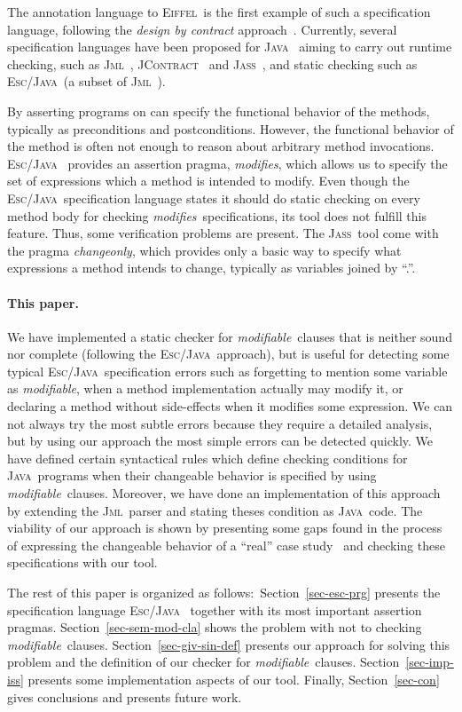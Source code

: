 \documentclass[a4paper]{llncs}
\newcommand{\jml}{\textsc{Jml}}
\newcommand{\escj}{\textsc{Esc/Java}}
\newcommand{\jass}{\textsc{Jass}}
\newcommand{\jcontract}{\textsc{JContract}}
\newcommand{\java}{\textsc{Java}}
\newcommand{\eiff}{\textsc{Eiffel}}
\newcommand{\modif}{\textit{modifiable}}
\newcommand{\modifies}{\textit{modifies}}
\begin{document}
The annotation language to \eiff~is the first example of such a
specification language, following the \emph{design by contract}
approach~\cite{Mey97}. Currently, several specification languages have
been proposed for \java~ aiming to carry out runtime
checking, such as \jml~\cite{LBR00}, \jcontract~\cite{JContractUrl} and
\jass~\cite{JassUrl}, and static checking such as
\escj~\cite{LeinoNS00}(a subset of \jml~\cite{EscJmlDiff}). 

By
asserting programs on can specify the functional
behavior of the methods, typically as preconditions and
postconditions. However, the functional behavior of the method is
often not enough to reason about arbitrary method
invocations. \escj~
provides an assertion pragma, \modifies, which allows us to
specify the set of expressions which a method is intended to
modify. Even though the \escj~specification language states it should
do static checking on every method body for checking
\modifies~specifications, its tool does not fulfill
this feature. Thus, some verification problems are
present. The \jass~tool come with the pragma \textit{changeonly},
which provides only a basic way to specify what expressions a method
intends to change, typically as variables joined by ``.''.

\paragraph{\bf This paper.}We
have implemented a static checker for \modif~clauses that is neither
sound nor complete (following the \escj~approach), but is useful
for detecting some typical \escj~specification errors such as
forgetting to mention some variable
as \modif, when a method implementation actually may modify it, or
declaring a method without side-effects when it modifies some
expression. We can not always try the most subtle errors because they 
require a detailed analysis, but by using our approach the most
simple errors can be detected quickly. We have defined certain
syntactical rules which define checking conditions for \java~programs
when their changeable behavior is specified by using
\modif~clauses. Moreover, we have done an implementation
of this approach by extending the \jml~parser and stating theses
condition as \java~code. The viability of our approach is
shown by presenting some gaps found in the process of expressing the
changeable behavior of a ``real'' case study~\cite{CH02} and checking
these specifications with our tool.


The rest of this paper is organized as follows$:$
Section~\ref{sec-esc-prg} presents the specification language \escj~
together with its most important assertion
pragmas. Section~\ref{sec-sem-mod-cla} shows the problem
with not to checking \modif~clauses. Section~\ref{sec-giv-sin-def}
presents our approach for solving this problem and the definition of
our checker for \modif~clauses. Section~\ref{sec-imp-iss} presents
some implementation aspects of our tool. Finally, Section~\ref{sec-con}
gives conclusions and presents future work.
\end{document}
